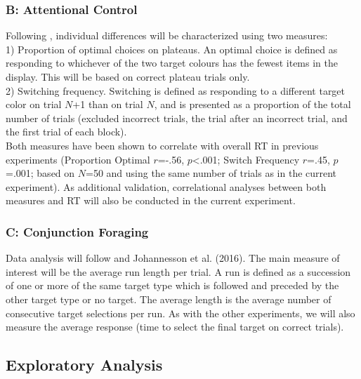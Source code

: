 \documentclass[a4paper, oneside, 11pt, onecolumn]{article}
\begin{document}
\subsubsection{B: Attentional Control}

Following \cite{irons-leber2016}, individual differences will be characterized using two measures:\\
1) Proportion of optimal choices on plateaus. An optimal choice is defined as responding to whichever of the two target colours has the fewest items in the display. This will be based on correct plateau trials only. \\ 
2) Switching frequency. Switching is defined as responding to a different target color on trial $N$+1 than on trial $N$, and is presented as a proportion of the total number of trials (excluded incorrect trials, the trial after an incorrect trial, and the first trial of each block).\\
Both measures have been shown to correlate with overall RT in previous experiments (Proportion Optimal $r$=-.56, $p$<.001; Switch Frequency $r$=.45, $p$=.001; based on $N$=50 and using the same number of trials as in the current experiment). As additional validation, correlational analyses between both measures and RT will also be conducted in the current experiment.

\subsubsection{C: Conjunction Foraging}

Data analysis will follow \cite{kristjansson2014} and Johannesson et al. (2016). The main measure of interest will be the average run length per trial. A run is defined as a succession of one or more of the same target type which is followed and preceded by the other target type or no target. The average length is the average number of consecutive target selections per run. As with the other experiments, we will also measure the average response (time to select the final target on correct trials).

\subsubsection{}


\subsection{Exploratory Analysis}
\end{document}
